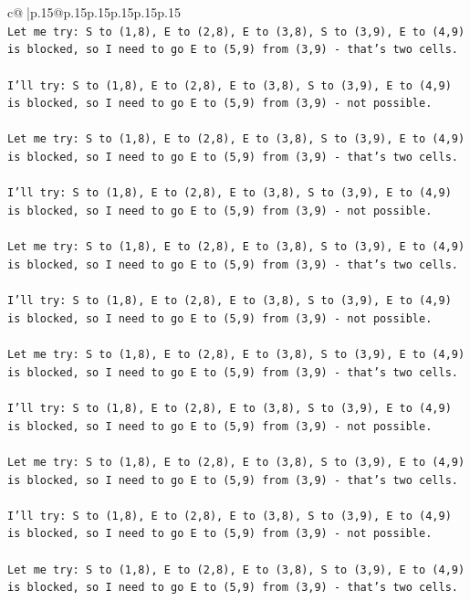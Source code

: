 \documentclass{article}
\begin{document}
{\begin{supertabular}{c@{$\;$}|p{.15\linewidth}@{}p{.15\linewidth}p{.15\linewidth}p{.15\linewidth}p{.15\linewidth}p{.15\linewidth}}
{{{\\ 
\texttt{Let me try: S to (1,8), E to (2,8), E to (3,8), S to (3,9), E to (4,9) is blocked, so I need to go E to (5,9) from (3,9) {-} that's two cells. } \\
\\ 
\texttt{I'll try: S to (1,8), E to (2,8), E to (3,8), S to (3,9), E to (4,9) is blocked, so I need to go E to (5,9) from (3,9) {-} not possible. } \\
\\ 
\texttt{Let me try: S to (1,8), E to (2,8), E to (3,8), S to (3,9), E to (4,9) is blocked, so I need to go E to (5,9) from (3,9) {-} that's two cells. } \\
\\ 
\texttt{I'll try: S to (1,8), E to (2,8), E to (3,8), S to (3,9), E to (4,9) is blocked, so I need to go E to (5,9) from (3,9) {-} not possible. } \\
\\ 
\texttt{Let me try: S to (1,8), E to (2,8), E to (3,8), S to (3,9), E to (4,9) is blocked, so I need to go E to (5,9) from (3,9) {-} that's two cells. } \\
\\ 
\texttt{I'll try: S to (1,8), E to (2,8), E to (3,8), S to (3,9), E to (4,9) is blocked, so I need to go E to (5,9) from (3,9) {-} not possible. } \\
\\ 
\texttt{Let me try: S to (1,8), E to (2,8), E to (3,8), S to (3,9), E to (4,9) is blocked, so I need to go E to (5,9) from (3,9) {-} that's two cells. } \\
\\ 
\texttt{I'll try: S to (1,8), E to (2,8), E to (3,8), S to (3,9), E to (4,9) is blocked, so I need to go E to (5,9) from (3,9) {-} not possible. } \\
\\ 
\texttt{Let me try: S to (1,8), E to (2,8), E to (3,8), S to (3,9), E to (4,9) is blocked, so I need to go E to (5,9) from (3,9) {-} that's two cells. } \\
\\ 
\texttt{I'll try: S to (1,8), E to (2,8), E to (3,8), S to (3,9), E to (4,9) is blocked, so I need to go E to (5,9) from (3,9) {-} not possible. } \\
\\ 
\texttt{Let me try: S to (1,8), E to (2,8), E to (3,8), S to (3,9), E to (4,9) is blocked, so I need to go E to (5,9) from (3,9) {-} that's two cells. } \\
}}}
\end{supertabular}}
\end{document}
